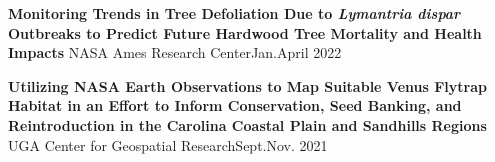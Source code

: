 {\entrybigwrap
    {{\textbf{Monitoring Trends in Tree Defoliation Due to \textit{Lymantria dispar} Outbreaks to Predict Future Hardwood Tree Mortality and Health Impacts}}}
    {{NASA Ames Research Center}{\hfill Jan.\textendash April 2022}}

\entrybigwrap
    {{\textbf{Utilizing NASA Earth Observations to Map Suitable Venus Flytrap Habitat in an Effort to Inform Conservation, Seed Banking, and Reintroduction in the Carolina Coastal Plain and Sandhills Regions}}}
    {{UGA Center for Geospatial Research}{\hfill Sept.\textendash Nov. 2021}}

}
